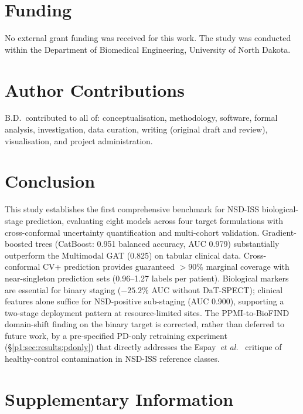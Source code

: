\section*{Funding}
No external grant funding was received for this work. The study was conducted within the Department of Biomedical Engineering, University of North Dakota.

\section*{Author Contributions}
B.D.\ contributed to all of: conceptualisation, methodology, software, formal analysis, investigation, data curation, writing (original draft and review), visualisation, and project administration.

\section{Conclusion}
\label{p1:sec:conclusion}

This study establishes the first comprehensive benchmark for NSD-ISS biological-stage prediction, evaluating eight models across four target formulations with cross-conformal uncertainty quantification and multi-cohort validation. Gradient-boosted trees (CatBoost: 0.951 balanced accuracy, AUC 0.979) substantially outperform the Multimodal GAT (0.825) on tabular clinical data. Cross-conformal CV+ prediction provides guaranteed $>90\%$ marginal coverage with near-singleton prediction sets (0.96--1.27 labels per patient). Biological markers are essential for binary staging ($-25.2\%$ AUC without DaT-SPECT); clinical features alone suffice for NSD-positive sub-staging (AUC 0.900), supporting a two-stage deployment pattern at resource-limited sites. The PPMI-to-BioFIND domain-shift finding on the binary target is corrected, rather than deferred to future work, by a pre-specified PD-only retraining experiment (\S\ref{p1:sec:results:pdonly}) that directly addresses the Espay~\textit{et al.}~\cite{espay2025med} critique of healthy-control contamination in NSD-ISS reference classes.

\section*{Supplementary Information}
\label{p1:sec:supp}

